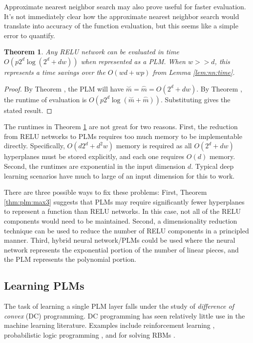 \documentclass{article}
\newtheorem{theorem}{Theorem}
\newcommand{\defn}[1]{\textit{#1}}
\newcommand{\mconvex}{{\stackrel\smile m}}
\newcommand{\mconcave}{{\stackrel\frown m}}
\begin{document}
Approximate nearest neighbor search may also prove useful for faster evaluation.
It's not immediately clear how the approximate nearest neighbor search would translate into accuracy of the function evaluation,
but this seems like a simple error to quantify.


\begin{theorem}
Any RELU network can be evaluated in time $O(p2^d\log(2^d+dw))$ when represented as a PLM.
When $w>\!\!>d$, this represents a time savings over the $O(wd+wp)$ from Lemma \ref{lem:nn:time}.
\label{thm:plm:time:relu}
\end{theorem}
\begin{proof}
By Theorem \label{thm:plm:nn}, the PLM will have $\mconvex=\mconcave=O(2^d+dw)$. 
By Theorem \label{thm:plm:time}, the runtime of evaluation is $O(p2^d\log(\mconvex+\mconcave)).$
Substituting gives the stated result.
\end{proof}

The runtimes in Theorem \ref{thm:plm:time:relu} are not great for two reasons.
First, the reduction from RELU networks to PLMs requires too much memory to be implementable directly.
Specifically, $O(d2^d+d^2w)$ memory is required as all $O(2^d+dw)$ hyperplanes must be stored explicitly, 
and each one requires $O(d)$ memory.
Second, the runtimes are exponential in the input dimension $d$.
Typical deep learning scenarios have much to large of an input dimension for this to work.

There are three possible ways to fix these problems:
First, Theorem \ref{thm:plm:max3} suggests that PLMs may require significantly fewer hyperplanes to represent a function than RELU networks.
In this case, not all of the RELU components would need to be maintained.
Second, a dimensionality reduction technique can be used to reduce the number of RELU components in a principled manner.
Third, hybrid neural network/PLMs could be used where the neural network represents the exponential portion of the number of linear pieces, 
and the PLM represents the polynomial portion.

\subsection{Learning PLMs}

The task of learning a single PLM layer falls under the study of \defn{difference of convex} (DC) programming.
DC programming has seen relatively little use in the machine learning literature.
Examples include reinforcement learning \citep{piot2014difference}, 
probabilistic logic programming \citep{bach2015hinge},
and for solving RBMs \citep{upadhya2017learning}. 
\end{document}
